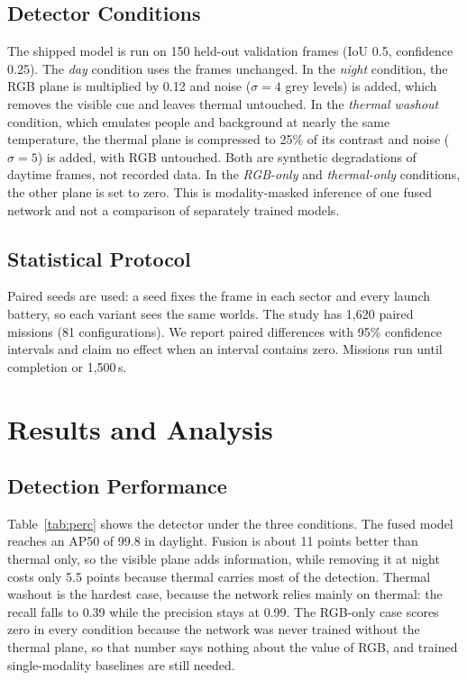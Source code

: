 \documentclass[10pt,letterpaper]{article}
\begin{document}
\subsection{Detector Conditions}
The shipped model is run on 150 held-out validation frames (IoU 0.5, confidence 0.25). The \emph{day} condition uses the frames unchanged. In the \emph{night} condition, the RGB plane is multiplied by 0.12 and noise ($\sigma=4$ grey levels) is added, which removes the visible cue and leaves thermal untouched. In the \emph{thermal washout} condition, which emulates people and background at nearly the same temperature, the thermal plane is compressed to 25\% of its contrast and noise ($\sigma=5$) is added, with RGB untouched. Both are synthetic degradations of daytime frames, not recorded data. In the \emph{RGB-only} and \emph{thermal-only} conditions, the other plane is set to zero. This is modality-masked inference of one fused network and not a comparison of separately trained models.



\subsection{Statistical Protocol}
Paired seeds are used: a seed fixes the frame in each sector and every launch battery, so each variant sees the same worlds. The study has 1,620 paired missions (81 configurations). We report paired differences with 95\% confidence intervals and claim no effect when an interval contains zero. Missions run until completion or 1,500\,s.

\section{Results and Analysis}\label{sec:results}
\subsection{Detection Performance}
Table~\ref{tab:perc} shows the detector under the three conditions. The fused model reaches an AP50 of 99.8 in daylight. Fusion is about 11 points better than thermal only, so the visible plane adds information, while removing it at night costs only 5.5 points because thermal carries most of the detection. Thermal washout is the hardest case, because the network relies mainly on thermal: the recall falls to 0.39 while the precision stays at 0.99. The RGB-only case scores zero in every condition because the network was never trained without the thermal plane, so that number says nothing about the value of RGB, and trained single-modality baselines are still needed.
\end{document}
